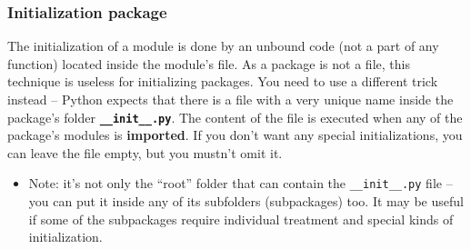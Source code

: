 \documentclass[11pt]{article}
\begin{document}
\subsubsection{Initialization package}
\label{sec:org85ede15}
The initialization of a module is done by an unbound code (not a part
of any function) located inside the module’s file. As a package is not
a file, this technique is useless for initializing packages. You need
to use a different trick instead – Python expects that there is a file
with a very unique name inside the package’s folder \textbf{\texttt{\_\_init\_\_.py}}.
The content of the file is executed when any of the package’s modules
is \textbf{imported}. If you don’t want any special initializations, you can
leave the file empty, but you mustn’t omit it.


\begin{itemize}
\item Note: it’s not only the “root” folder that can contain the
\texttt{\_\_init\_\_.py} file – you can put it inside any of its subfolders
(subpackages) too. It may be useful if some of the subpackages require
individual treatment and special kinds of initialization.
\end{itemize}
\end{document}
